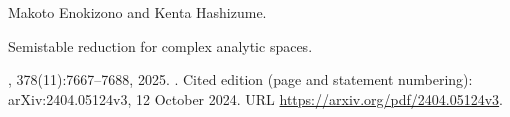 Makoto Enokizono and Kenta Hashizume.

\newblock Semistable reduction for complex analytic spaces.

, 378(11):7667--7688, 2025.
\newblock {}.
\newblock Cited edition (page and statement numbering): arXiv:2404.05124v3, 12 October 2024.
\newblock URL \url{https://arxiv.org/pdf/2404.05124v3}.

